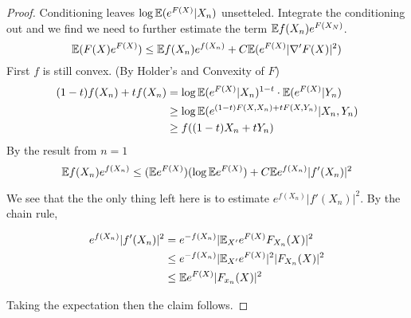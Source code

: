 \begin{proof}
    Conditioning leaves $\log \mathbb{E}(e^{F(X)}|X_n)$ unsetteled. Integrate the conditioning out and we find we need to further estimate the term $\mathbb{E} f(X_n) e^{F(X_N)}$.
    \begin{equation*}
        \mathbb{E}(F(X)e^{F(X)}) \leq \mathbb{E} f(X_n) e^{f(X_n)} + C\mathbb{E} (e^{F(X)}|\nabla'F(X)|^2)
    \end{equation*}
    First $f$ is still convex. (By Holder's and Convexity of $F$)
    \begin{align*}
        (1-t)f(X_n)+tf(X_n) & = \log \mathbb{E}(e^{F(X)}|X_n)^{1-t} \cdot \mathbb{E}(e^{F(X)}|Y_n) \\
        & \geq \log \mathbb{E} (e^{(1-t)F(X,X_n)+tF(X,Y_n)}|X_n,Y_n) \\
        & \geq f((1-t)X_n+tY_n)
    \end{align*}
    By the result from $n=1$
    \begin{equation*}
        \mathbb{E} f(X_n)e^{f(X_n)} \leq (\mathbb{E} e^{F(X)}) ( \log \mathbb{E} e^{F(X)} ) + C\mathbb{E} e^{f(X_n)} |f'(X_n)|^2
    \end{equation*}

    We see that the the only thing left here is to estimate $ e^{f(X_n)}|f'(X_n)|^2$. By the chain rule,

    \begin{align*}
        e^{f(X_n)}|f'(X_n)|^2 &= e^{-f(X_n)}|\mathbb{E}_{X'}e^{F(X)} F_{X_n}(X)|^2 \\
        &\leq e^{-f(X_n)}|\mathbb{E}_{X'} e^{F(X)}|^2 |F_{X_n}(X)|^2 \\
        &\leq \mathbb{E} e^{F(X)} |F_{x_n}(X)|^2
    \end{align*}

    Taking the expectation then the claim follows.
\end{proof}

